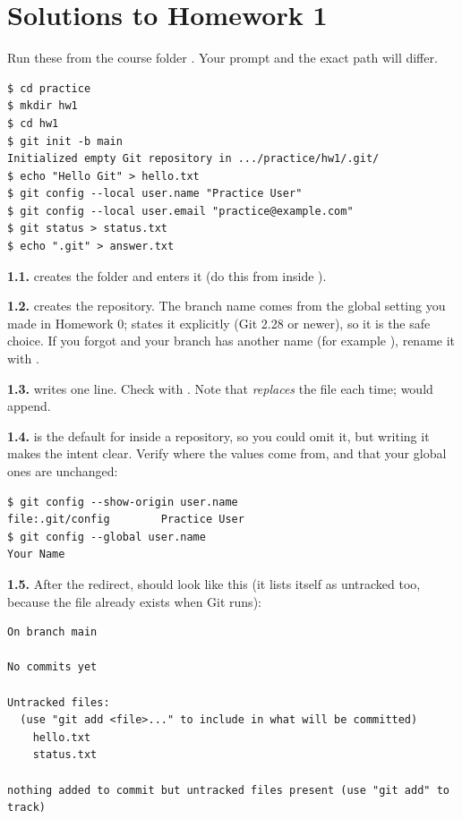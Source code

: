 \section*{Solutions to Homework 1}

Run these from the course folder . Your prompt and the exact path will differ.

\begin{lstlisting}
$ cd practice
$ mkdir hw1
$ cd hw1
$ git init -b main
Initialized empty Git repository in .../practice/hw1/.git/
$ echo "Hello Git" > hello.txt
$ git config --local user.name "Practice User"
$ git config --local user.email "practice@example.com"
$ git status > status.txt
$ echo ".git" > answer.txt
\end{lstlisting}

\textbf{1.1.}  creates the folder and  enters it (do this from inside ).

\textbf{1.2.}  creates the repository. The branch name comes from the global setting you made in Homework 0;  states it explicitly (Git 2.28 or newer), so it is the safe choice. If you forgot and your branch has another name (for example ), rename it with .

\textbf{1.3.}  writes one line. Check with . Note that \code{>} \emph{replaces} the file each time; \code{>>} would append.

\textbf{1.4.}  is the default for  inside a repository, so you could omit it, but writing it makes the intent clear. Verify where the values come from, and that your global ones are unchanged:
\begin{lstlisting}
$ git config --show-origin user.name
file:.git/config        Practice User
$ git config --global user.name
Your Name
\end{lstlisting}

\textbf{1.5.} After the redirect,  should look like this (it lists itself as untracked too, because the file already exists when Git runs):
\begin{lstlisting}
On branch main

No commits yet

Untracked files:
  (use "git add <file>..." to include in what will be committed)
	hello.txt
	status.txt

nothing added to commit but untracked files present (use "git add" to track)
\end{lstlisting}

